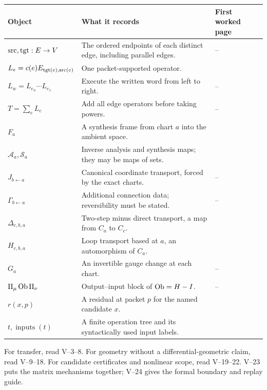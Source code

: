 {\small
\begin{tabularx}{\linewidth}{@{}p{.27\linewidth}Yp{.20\linewidth}@{}}\toprule
\textbf{Object} & \textbf{What it records} & \textbf{First worked page}\\\midrule
$\operatorname{src},\operatorname{tgt}:E\to V$ & The ordered endpoints of each distinct edge, including parallel edges. & --\\
$L_e=c(e)E_{\operatorname{tgt}(e),\operatorname{src}(e)}$ & One packet-supported operator. & \\
$L_w=L_{e_n}\cdots L_{e_1}$ & Execute the written word from left to right. & --\\
$T=\sum_eL_e$ & Add all edge operators before taking powers. & --\\
$F_a$ & A synthesis frame from chart $a$ into the ambient space. & \\
$\mathcal A_a,\mathcal S_a$ & Inverse analysis and synthesis maps; they may be maps of sets. & \\
$J_{b\leftarrow a}$ & Canonical coordinate transport, forced by the exact charts. & --\\
$\Gamma_{b\leftarrow a}$ & Additional connection data; reversibility must be stated. & --\\
$\Delta_{c,b,a}$ & Two-step minus direct transport, a map from $C_a$ to $C_c$. & \\
$H_{c,b,a}$ & Loop transport based at $a$, an automorphism of $C_a$. & \\
$G_a$ & An invertible gauge change at each chart. & --\\
$\Pi_\mu\operatorname{Ob}\Pi_\nu$ & Output--input block of $\operatorname{Ob}=H-I$. & --\\
$r(x,p)$ & A residual at packet $p$ for the named candidate $x$. & \\
$t,\operatorname{inputs}(t)$ & A finite operation tree and its syntactically used input labels. & \\\bottomrule
\end{tabularx}}

For transfer, read V--3--8. For geometry without a differential-geometric claim, read V--9--18. For candidate certificates and nonlinear scope, read V--19--22. V--23 puts the matrix mechanisms together; V--24 gives the formal boundary and replay guide.

